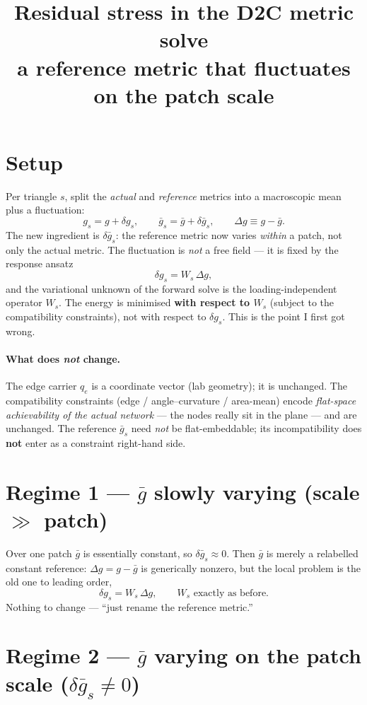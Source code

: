 \documentclass[11pt]{article}
\title{\vspace{-1.5em}Residual stress in the D2C metric solve\\
\large a reference metric that fluctuates on the patch scale}
\author{}
\date{}
\newcommand{\dg}{\delta g}
\newcommand{\dgb}{\delta\bar g}
\newcommand{\Dg}{\Delta g}
\begin{document}
\maketitle
\vspace{-3em}

\section*{Setup}

Per triangle $s$, split the \emph{actual} and \emph{reference} metrics into a macroscopic mean plus a
fluctuation:
\[
g_s = g + \dg_s,
\qquad
\bar g_s = \bar g + \dgb_s,
\qquad
\Dg \equiv g - \bar g .
\]
The new ingredient is $\dgb_s$: the reference metric now varies \emph{within} a patch, not only the
actual metric. The fluctuation is \emph{not} a free field --- it is fixed by the response ansatz
\[
\dg_s = W_s\,\Dg ,
\]
and the variational unknown of the forward solve is the loading-independent operator $W_s$. The energy
is minimised \textbf{with respect to $W_s$} (subject to the compatibility constraints), not with respect
to $\dg_s$. This is the point I first got wrong.

\paragraph{What does \emph{not} change.}
The edge carrier $q_e$ is a coordinate vector (lab geometry); it is unchanged. The compatibility
constraints (edge / angle--curvature / area-mean) encode \emph{flat-space achievability of the actual
network} --- the nodes really sit in the plane --- and are unchanged. The reference $\bar g_s$ need
\emph{not} be flat-embeddable; its incompatibility does \textbf{not} enter as a constraint right-hand
side.

\section*{Regime 1 --- $\bar g$ slowly varying (scale $\gg$ patch)}

Over one patch $\bar g$ is essentially constant, so $\dgb_s \approx 0$. Then $\bar g$ is merely a
relabelled constant reference: $\Dg = g-\bar g$ is generically nonzero, but the local problem is the
old one to leading order,
\[
\dg_s = W_s\,\Dg,\qquad W_s \text{ exactly as before.}
\]
Nothing to change --- ``just rename the reference metric.''

\section*{Regime 2 --- $\bar g$ varying on the patch scale ($\dgb_s \neq 0$)}
\end{document}
